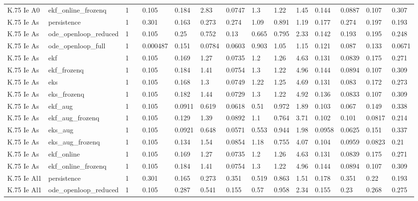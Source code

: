 \begin{table}[t]
\begin{tabular}{lllllllllllllll}
K.75 Ie A0 & ekf\_online\_frozenq & 1 &  & 0.105 & 0.184 & 2.83 & 0.0747 & 1.3 & 1.22 & 1.45 & 0.144 & 0.0887 & 0.107 & 0.307 \\
K.75 Ie As & persistence & 1 &  & 0.301 & 0.163 & 0.273 & 0.274 & 1.09 & 0.891 & 1.19 & 0.177 & 0.274 & 0.197 & 0.193 \\
K.75 Ie As & ode\_openloop\_reduced & 1 &  & 0.105 & 0.25 & 0.752 & 0.13 & 0.665 & 0.795 & 2.33 & 0.142 & 0.193 & 0.195 & 0.248 \\
K.75 Ie As & ode\_openloop\_full & 1 &  & 0.000487 & 0.151 & 0.0784 & 0.0603 & 0.903 & 1.05 & 1.15 & 0.121 & 0.087 & 0.133 & 0.0671 \\
K.75 Ie As & ekf & 1 &  & 0.105 & 0.169 & 1.27 & 0.0735 & 1.2 & 1.26 & 4.63 & 0.131 & 0.0839 & 0.175 & 0.271 \\
K.75 Ie As & ekf\_frozenq & 1 &  & 0.105 & 0.184 & 1.41 & 0.0754 & 1.3 & 1.22 & 4.96 & 0.144 & 0.0894 & 0.107 & 0.309 \\
K.75 Ie As & eks & 1 &  & 0.105 & 0.168 & 1.3 & 0.0749 & 1.22 & 1.25 & 4.69 & 0.131 & 0.083 & 0.172 & 0.273 \\
K.75 Ie As & eks\_frozenq & 1 &  & 0.105 & 0.182 & 1.44 & 0.0729 & 1.3 & 1.22 & 4.92 & 0.136 & 0.0833 & 0.107 & 0.309 \\
K.75 Ie As & ekf\_aug & 1 &  & 0.105 & 0.0911 & 0.619 & 0.0618 & 0.51 & 0.972 & 1.89 & 0.103 & 0.067 & 0.149 & 0.338 \\
K.75 Ie As & ekf\_aug\_frozenq & 1 &  & 0.105 & 0.129 & 1.39 & 0.0892 & 1.1 & 0.764 & 3.71 & 0.102 & 0.101 & 0.0817 & 0.214 \\
K.75 Ie As & eks\_aug & 1 &  & 0.105 & 0.0921 & 0.648 & 0.0571 & 0.553 & 0.944 & 1.98 & 0.0958 & 0.0625 & 0.151 & 0.337 \\
K.75 Ie As & eks\_aug\_frozenq & 1 &  & 0.105 & 0.134 & 1.54 & 0.0854 & 1.18 & 0.755 & 4.07 & 0.104 & 0.0959 & 0.0823 & 0.21 \\
K.75 Ie As & ekf\_online & 1 &  & 0.105 & 0.169 & 1.27 & 0.0735 & 1.2 & 1.26 & 4.63 & 0.131 & 0.0839 & 0.175 & 0.271 \\
K.75 Ie As & ekf\_online\_frozenq & 1 &  & 0.105 & 0.184 & 1.41 & 0.0754 & 1.3 & 1.22 & 4.96 & 0.144 & 0.0894 & 0.107 & 0.309 \\
K.75 Ie Al1 & persistence & 1 &  & 0.301 & 0.165 & 0.273 & 0.351 & 0.519 & 0.863 & 1.51 & 0.178 & 0.351 & 0.22 & 0.193 \\
K.75 Ie Al1 & ode\_openloop\_reduced & 1 &  & 0.105 & 0.287 & 0.541 & 0.155 & 0.57 & 0.958 & 2.34 & 0.155 & 0.23 & 0.268 & 0.275 \\

\end{tabular}
\end{table}
